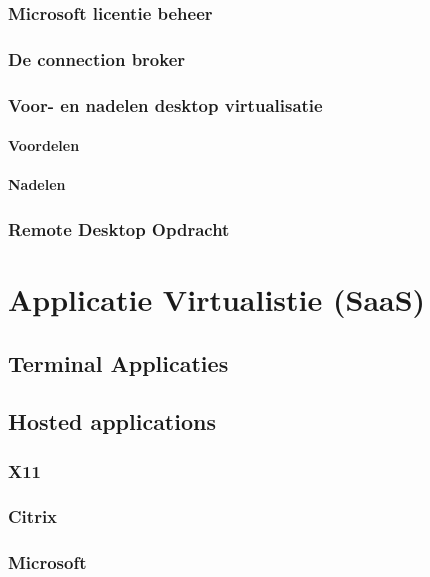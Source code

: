 \documentclass[a4paper,12pt,twoside,openright,titlepage]{book}
\begin{document}
\subsection{Microsoft licentie beheer}

\subsection{De connection broker}

\subsection{Voor- en nadelen desktop virtualisatie}
\subsubsection{Voordelen}

\subsubsection{Nadelen}

\subsection{Remote Desktop Opdracht}


\chapter{Applicatie Virtualistie (SaaS)}

\section{Terminal Applicaties}

\section{Hosted applications}

\subsection{X11}

\subsection{Citrix}


\subsection{Microsoft}

\end{document}
